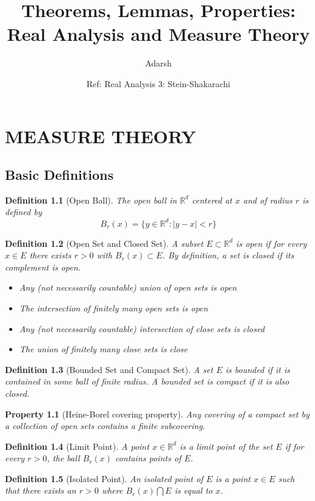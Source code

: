 \documentclass{report}
\title{Theorems, Lemmas, Properties: Real Analysis and Measure Theory}
\author{Adarsh}
\date{Ref: Real Analysis 3: Stein-Shakarachi}
\theoremstyle{upthm}
\newtheorem{defn}{Definition}
\newtheorem{property}{Property}
\newcommand{\reals}{\mathbb{R}}
\newcommand{\set}[1]{\big\lbrace #1 \big\rbrace}
\newcommand{\intersection}{\bigcap}
\begin{document}
\maketitle

\chapter{MEASURE THEORY}
\section{Basic Definitions}
\begin{defn}[Open Ball]
	The open ball in $\reals^d$ centered at $x$ and of radius $r$ is defined by
	$$B_r(x) = \set{y \in \reals^d : | y - x | < r}$$
\end{defn}
\begin{defn}[Open Set and Closed Set]
	A subset $E \subset \reals^d$ is open if for every $x \in E$ there exists $r > 0$ with
	$B_r(x) \subset E$. By definition, a set is closed if its complement is open. 
	\begin{itemize}
		\item Any (not necessarily countable) union of open sets is open
		\item The intersection of finitely many open sets is open
		\item Any (not necessarily countable) intersection of close sets is closed
		\item The union of finitely many close sets is close
	\end{itemize}
\end{defn}
\begin{defn}[Bounded Set and Compact Set]
	A set $E$ is bounded if it is contained in some ball of finite radius.	A bounded set is compact if it is also closed.
\end{defn}
\begin{property}[Heine-Borel covering property]
	Any covering of a compact set by a collection of open sets contains a finite subcovering.
\end{property}
\begin{defn}[Limit Point]
	A point $x \in \reals^d$ is a limit point of the set $E$ if for every $r > 0$, the ball
	$B_r(x)$ contains points of $E$.
\end{defn}
\begin{defn}[Isolated Point]
	An isolated point of $E$ is a point $x \in E$ such that there exists an $r > 0$ where $B_r(x) \intersection E$ is equal to $x$.
\end{defn}
\end{document}
